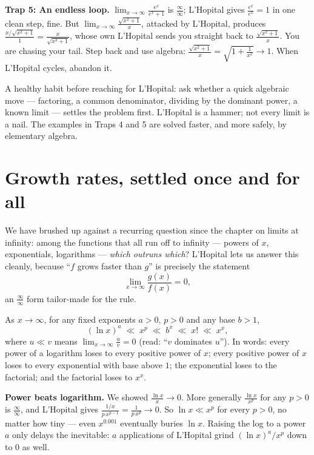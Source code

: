 \begin{trapbox}
\textbf{Trap 5: An endless loop.} $\displaystyle\lim_{x\to\infty}\frac{e^x}{e^x+1}$ is
$\tfrac{\infty}{\infty}$; L'Hopital gives $\tfrac{e^x}{e^x}=1$ in one clean step, fine.
But $\displaystyle\lim_{x\to\infty}\frac{\sqrt{x^2+1}}{x}$, attacked by L'Hopital,
produces $\frac{x/\sqrt{x^2+1}}{1}=\frac{x}{\sqrt{x^2+1}}$, whose own L'Hopital sends
you straight back to $\frac{\sqrt{x^2+1}}{x}$. You are chasing your tail. Step back and
use algebra: $\frac{\sqrt{x^2+1}}{x}=\sqrt{1+\tfrac{1}{x^2}}\to 1$. When L'Hopital
cycles, abandon it.
\end{trapbox}

\begin{recoverybox}
A healthy habit before reaching for L'Hopital: ask whether a quick algebraic move ---
factoring, a common denominator, dividing by the dominant power, a known limit ---
settles the problem first. L'Hopital is a hammer; not every limit is a nail. The
examples in Traps 4 and 5 are solved faster, and more safely, by elementary algebra.
\end{recoverybox}

\section{Growth rates, settled once and for all}

We have brushed up against a recurring question since the chapter on limits at
infinity: among the functions that all run off to infinity --- powers of $x$,
exponentials, logarithms --- \emph{which outruns which}? L'Hopital lets us answer this
cleanly, because ``$f$ grows faster than $g$'' is precisely the statement
\[
\lim_{x\to\infty}\frac{g(x)}{f(x)}=0,
\]
an $\tfrac{\infty}{\infty}$ form tailor-made for the rule.

\begin{theorem}\label{ch18:thm-growth}
As $x\to\infty$, for any fixed exponents $a>0$, $p>0$ and any base $b>1$,
\[
(\ln x)^{a}\;\ll\; x^{p}\;\ll\; b^{x}\;\ll\; x!\;\ll\; x^{x},
\]
where $u\ll v$ means $\lim_{x\to\infty}\tfrac{u}{v}=0$ (read: ``$v$ dominates $u$'').
In words: every power of a logarithm loses to every positive power of $x$; every
positive power of $x$ loses to every exponential with base above $1$; the exponential
loses to the factorial; and the factorial loses to $x^x$.
\end{theorem}

\begin{focusbox}
\textbf{Power beats logarithm.} We showed $\tfrac{\ln x}{x}\to 0$. More generally
$\tfrac{\ln x}{x^p}$ for any $p>0$ is $\tfrac{\infty}{\infty}$, and L'Hopital gives
$\tfrac{1/x}{p\,x^{p-1}}=\tfrac{1}{p\,x^{p}}\to 0$. So $\ln x\ll x^p$ for every $p>0$,
no matter how tiny --- even $x^{0.001}$ eventually buries $\ln x$. Raising the log to a
power $a$ only delays the inevitable: $a$ applications of L'Hopital grind
$(\ln x)^a/x^p$ down to $0$ as well.
\end{focusbox}


